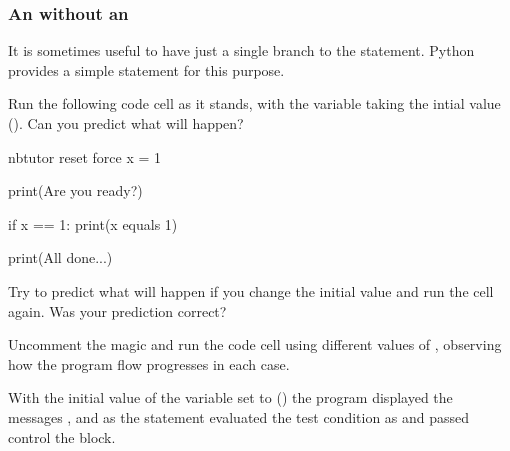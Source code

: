 \documentclass[letterpaper,10pt,english]{sphinxmanual}
\begin{document}
{\subsubsection{An  without an }
\label{\detokenize{content/02_Robot_Lab/Section_00_02:An-if..-without-an-else...}}
It is sometimes useful to have just a single branch to the  statement. Python provides a simple  statement for this purpose.

Run the following code cell as it stands, with the  variable taking the intial value  (). Can you predict what will happen?

{
\begin{sphinxVerbatim}[commandchars=\\\{\}]
\llap{\color{nbsphinxin}[ ]:\,\hspace{\fboxrule}\hspace{\fboxsep}}\PYGZsh{}\PYGZpc{}\PYGZpc{}nbtutor \PYGZhy{}\PYGZhy{}reset \PYGZhy{}\PYGZhy{}force
x = 1

print(\PYGZdq{}Are you ready?\PYGZdq{})

if x == 1:
    print(\PYGZdq{}x equals 1\PYGZdq{})

print(\PYGZdq{}All done...\PYGZdq{})
\end{sphinxVerbatim}
}

Try to predict what will happen if you change the initial value and run the cell again. Was your prediction correct?

Uncomment the  magic and run the code cell using different values of , observing how the program flow progresses in each case.


With the initial value of the variable  set to  () the program displayed the messages ,  and  as the  statement evaluated the  test condition as  and passed control  the  block.

}
\end{document}
